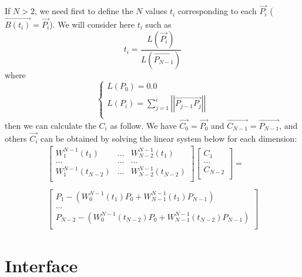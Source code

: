 If $N>2$, we need first to define the $N$ values $t_i$ corresponding to each $\overrightarrow{P_i}$ ($\overrightarrow{B(t_i)}=\overrightarrow{P_i}$). We will consider here $t_i$ such as\\
\begin{equation}
t_i=\frac{L(\overrightarrow{P_i})}{L(\overrightarrow{P_{N-1}})}
\end{equation}
where
\begin{equation}
\left\lbrace
\begin{array}{l}
L(P_0)=0.0\\
L(P_i)=\sum^i_{j=1}\left|\left|\overrightarrow{P_{j-1}P_j}\right|\right|\\
\end{array}
\right.
\end{equation}
then we can calculate the $C_i$ as follow. We have $\overrightarrow{C_0}=\overrightarrow{P_0}$ and $\overrightarrow{C_{N-1}}=\overrightarrow{P_{N-1}}$, and others $\overrightarrow{C_i}$ can be obtained by solving the linear system below for each dimension:\\
\begin{equation}
\begin{array}{c}
\left[
\begin{array}{ccc}
W^{N-1}_1(t_1)&...&W^{N-1}_{N-2}(t_1)\\
...&...&...\\
W^{N-1}_1(t_{N-2})&...&W^{N-1}_{N-2}(t_{N-2})\\
\end{array}
\right]\left[
\begin{array}{c}
C_1\\
...\\
C_{N-2}\\
\end{array}
\right]=\\
\\
\left[
\begin{array}{c}
P_1-\left(W^{N-1}_0(t_1)P_0+W^{N-1}_{N-1}(t_1)P_{N-1}\right)\\
...\\
P_{N-2}-\left(W^{N-1}_0(t_{N-2})P_0+W^{N-1}_{N-1}(t_{N-2})P_{N-1}\right)\\
\end{array}
\right]
\end{array}
\end{equation}

\section{Interface}

